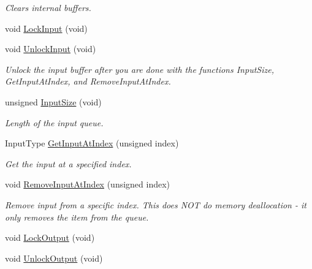 \begin{DoxyCompactItemize}
\begin{DoxyCompactList}\small\item\em Clears internal buffers. \end{DoxyCompactList}\item 
void \hyperlink{struct_thread_pool_a024e2da38f846fc76d1fb16cf13c1b90}{Lock\-Input} (void)
\item 
\hypertarget{struct_thread_pool_a710a554919e550501f9f06ab61e1d911}{void \hyperlink{struct_thread_pool_a710a554919e550501f9f06ab61e1d911}{Unlock\-Input} (void)}\label{struct_thread_pool_a710a554919e550501f9f06ab61e1d911}

\begin{DoxyCompactList}\small\item\em Unlock the input buffer after you are done with the functions Input\-Size, Get\-Input\-At\-Index, and Remove\-Input\-At\-Index. \end{DoxyCompactList}\item 
\hypertarget{struct_thread_pool_a0c7631f35a83c4f992b881174b6c8eff}{unsigned \hyperlink{struct_thread_pool_a0c7631f35a83c4f992b881174b6c8eff}{Input\-Size} (void)}\label{struct_thread_pool_a0c7631f35a83c4f992b881174b6c8eff}

\begin{DoxyCompactList}\small\item\em Length of the input queue. \end{DoxyCompactList}\item 
\hypertarget{struct_thread_pool_a09194411e4f4d87804111459fad24522}{Input\-Type \hyperlink{struct_thread_pool_a09194411e4f4d87804111459fad24522}{Get\-Input\-At\-Index} (unsigned index)}\label{struct_thread_pool_a09194411e4f4d87804111459fad24522}

\begin{DoxyCompactList}\small\item\em Get the input at a specified index. \end{DoxyCompactList}\item 
\hypertarget{struct_thread_pool_a7e41bfe6660b1a55cbf14b99b77defac}{void \hyperlink{struct_thread_pool_a7e41bfe6660b1a55cbf14b99b77defac}{Remove\-Input\-At\-Index} (unsigned index)}\label{struct_thread_pool_a7e41bfe6660b1a55cbf14b99b77defac}

\begin{DoxyCompactList}\small\item\em Remove input from a specific index. This does N\-O\-T do memory deallocation -\/ it only removes the item from the queue. \end{DoxyCompactList}\item 
void \hyperlink{struct_thread_pool_a384ba5c62d60ac2e12e3f8aeea30d8bc}{Lock\-Output} (void)
\item 
\hypertarget{struct_thread_pool_af6e5208df0686a4a76ecb3bbcc6ffcb2}{void \hyperlink{struct_thread_pool_af6e5208df0686a4a76ecb3bbcc6ffcb2}{Unlock\-Output} (void)}\label{struct_thread_pool_af6e5208df0686a4a76ecb3bbcc6ffcb2}


\end{DoxyCompactItemize}
